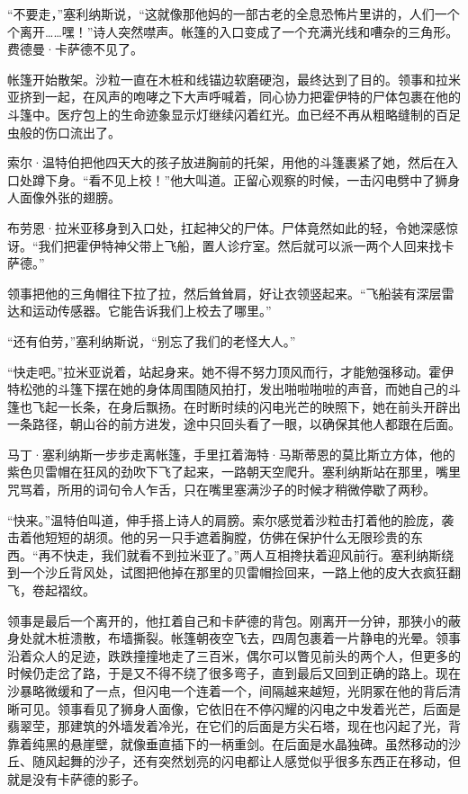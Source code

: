 \documentclass[AutoFakeBold=true]{book}
\begin{document}
``不要走，''塞利纳斯说，``这就像那他妈的一部古老的全息恐怖片里讲的，人们一个个离开……嘿！''诗人突然噤声。帐篷的入口变成了一个充满光线和嘈杂的三角形。费德曼·卡萨德不见了。

\vspace*{1em}

帐篷开始散架。沙粒一直在木桩和线锚边软磨硬泡，最终达到了目的。领事和拉米亚挤到一起，在风声的咆哮之下大声呼喊着，同心协力把霍伊特的尸体包裹在他的斗篷中。医疗包上的生命迹象显示灯继续闪着红光。血已经不再从粗略缝制的百足虫般的伤口流出了。

索尔·温特伯把他四天大的孩子放进胸前的托架，用他的斗篷裹紧了她，然后在入口处蹲下身。``看不见上校！''他大叫道。正留心观察的时候，一击闪电劈中了狮身人面像外张的翅膀。

布劳恩·拉米亚移身到入口处，扛起神父的尸体。尸体竟然如此的轻，令她深感惊讶。``我们把霍伊特神父带上飞船，置人诊疗室。然后就可以派一两个人回来找卡萨德。''

领事把他的三角帽往下拉了拉，然后耸耸肩，好让衣领竖起来。``飞船装有深层雷达和运动传感器。它能告诉我们上校去了哪里。''

``还有伯劳，''塞利纳斯说，``别忘了我们的老怪大人。''

``快走吧。''拉米亚说着，站起身来。她不得不努力顶风而行，才能勉强移动。霍伊特松弛的斗篷下摆在她的身体周围随风拍打，发出啪啦啪啦的声音，而她自己的斗篷也飞起一长条，在身后飘扬。在时断时续的闪电光芒的映照下，她在前头开辟出一条路径，朝山谷的前方进发，途中只回头看了一眼，以确保其他人都跟在后面。

马丁·塞利纳斯一步步走离帐篷，手里扛着海特·马斯蒂恩的莫比斯立方体，他的紫色贝雷帽在狂风的劲吹下飞了起来，一路朝天空爬升。塞利纳斯站在那里，嘴里咒骂着，所用的词句令人乍舌，只在嘴里塞满沙子的时候才稍微停歇了两秒。

``快来。''温特伯叫道，伸手搭上诗人的肩膀。索尔感觉着沙粒击打着他的脸庞，袭击着他短短的胡须。他的另一只手遮着胸膛，仿佛在保护什么无限珍贵的东西。``再不快走，我们就看不到拉米亚了。''两人互相搀扶着迎风前行。塞利纳斯绕到一个沙丘背风处，试图把他掉在那里的贝雷帽捡回来，一路上他的皮大衣疯狂翻飞，卷起褶纹。

领事是最后一个离开的，他扛着自己和卡萨德的背包。刚离开一分钟，那狭小的蔽身处就木桩溃散，布墙撕裂。帐篷朝夜空飞去，四周包裹着一片静电的光晕。领事沿着众人的足迹，跌跌撞撞地走了三百米，偶尔可以瞥见前头的两个人，但更多的时候仍走岔了路，于是又不得不绕了很多弯子，直到最后又回到正确的路上。现在沙暴略微缓和了一点，但闪电一个连着一个，间隔越来越短，光阴冢在他的背后清晰可见。领事看见了狮身人面像，它依旧在不停闪耀的闪电之中发着光芒，后面是翡翠茔，那建筑的外墙发着冷光，在它们的后面是方尖石塔，现在也闪起了光，背靠着纯黑的悬崖壁，就像垂直插下的一柄重剑。在后面是水晶独碑。虽然移动的沙丘、随风起舞的沙子，还有突然划亮的闪电都让人感觉似乎很多东西正在移动，但就是没有卡萨德的影子。
\end{document}
